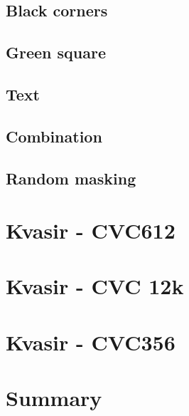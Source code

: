     \subsection{Black corners}
    \subsection{Green square}
    \subsection{Text}
    \subsection{Combination}
    \subsection{Random masking}
    
\section{Kvasir -  CVC612}
\section{Kvasir -  CVC 12k}
\section{Kvasir -  CVC356}

\section{Summary
}
